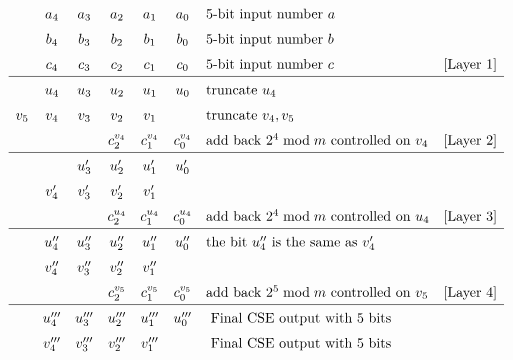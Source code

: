 \begin{center}
\begin{figure}[h!tb]
\begin{displaymath}
\renewcommand\arraystretch{1.5}
\begin{array}{ccccccll}
        & a_4 & a_3 & a_2 & a_1 & a_0 & 5\text{-bit input number } a &\\
        & b_4 & b_3 & b_2 & b_1 & b_0 & 5\text{-bit input number } b & \\
        & c_4 & c_3 & c_2 & c_1 & c_0 & 5\text{-bit input number } c & \text{[Layer 1]}\\
\hline
        & u_4 & u_3 & u_2 & u_1 & u_0 & \text{truncate } u_{4} & \\
    v_5 & v_4 & v_3 & v_2 & v_1 &     & \text{truncate } v_{4},v_{5} & \\
        &     &     & c^{v_4}_2 & c^{v_4}_1 & c^{v_4}_0 & \text{add back } 2^4 \bmod m \text{ controlled on } v_4 & \text{[Layer 2]}\\
\hline
        &      & u'_3 & u'_2 & u'_1 & u'_0 & & \\
        & v'_4 & v'_3 & v'_2 & v'_1 &      & & \\
        &      &    & c^{u_4}_2 & c^{u_4}_1 & c^{u_4}_0  & \text{add back } 2^4 \bmod m \text{ controlled on } u_4 & \text{[Layer 3]}\\
\hline
        & u''_4 & u''_3 & u''_2 & u''_1 & u''_0 & \text{the bit } u''_4 \text{ is the same as } v'_4 & \\
        & v''_4 & v''_3 & v''_2 & v''_1 &       &  & \\
        &       &    & c^{v_5}_2 & c^{v_5}_1 & c^{v_5}_0 & \text{add back } 2^5 \bmod m \text{ controlled on } v_5 & \text{[Layer 4]}\\
\hline
        & u'''_4 & u'''_3 & u'''_2 & u'''_1 & u'''_0 & \text{ Final CSE output with } 5 \text{ bits} &\\
        & v'''_4 & v'''_3 & v'''_2 & v'''_1 &        & \text{ Final CSE output with } 5 \text{ bits} & \\
\end{array}

\end{displaymath}
\end{figure}
\end{center}
